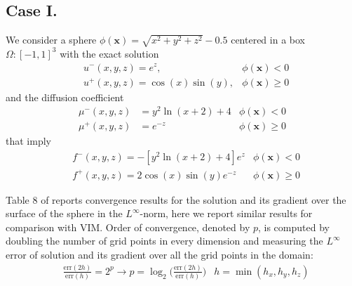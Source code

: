 \documentclass{elsarticle}
\begin{document}
\subsection{Case I.}
We consider a sphere $\phi(\mathbf{x})=\sqrt{x^2 + y^2 + z^2} - 0.5$ centered in a box $\Omega:[-1,1]^3$ with the exact solution
\begin{align*}
& u^-(x,y,z)=e^{z}, & \phi(\mathbf{x})<0\\
& u^+(x,y,z)=\cos(x)\sin(y), & \phi(\mathbf{x})\ge 0
\end{align*}
and the diffusion coefficient
\begin{align*}
\mu^-(x,y,z)&=y^2 \ln(x+2) + 4 &\phi(\mathbf{x})<0 \\
\mu^+(x,y,z)&=e^{-z} &\phi(\mathbf{x})\ge 0 
\end{align*}
that imply
\begin{align*}
&f^-(x,y,z)=-[y^2\ln(x+2) + 4] e^{z} &\phi(\mathbf{x})< 0\\
&f^+(x,y,z)=2\cos(x)\sin(y)e^{-z} &\phi(\mathbf{x})\ge 0
\end{align*}

Table 8 of \cite{guittet2015solving} reports convergence results for the solution and its gradient over the surface of the sphere in the $L^\infty$-norm, here we report similar results for comparison with VIM. Order of convergence, denoted by $p$, is computed by doubling the number of grid points in every dimension and measuring the $L^\infty$ error of solution and its gradient over all the grid points in the domain:
\begin{align*}
&\frac{\textrm{err}(2h)}{\textrm{err}(h)}=2^p \rightarrow p = \log_2\bigg(\frac{\textrm{err}(2h)}{\textrm{err}(h)}\bigg)  & h=\min(h_x,h_y,h_z)
\end{align*}
\end{document}
